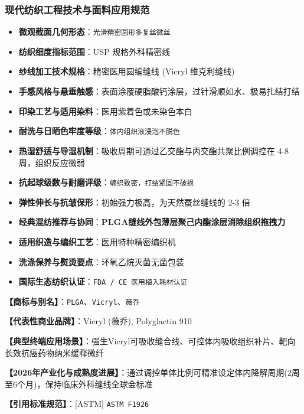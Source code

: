 \documentclass[11pt,openright,twoside,UTF8]{ctexbook}
\begin{document}
\subsubsection*{现代纺织工程技术与面料应用规范}
\begin{itemize} \setlength{\itemsep}{2pt}
    \item \textbf{微观截面几何形态}：\texttt{光滑精密圆形多复丝微丝}
    \item \textbf{纺织细度指标范围}：USP 规格外科精密线
    \item \textbf{纱线加工技术规格}：精密医用圆编缝线 (Vicryl 维克利缝线)
    \item \textbf{手感风格与悬垂触感}：表面涂覆硬脂酸钙涂层，过针滑顺如水、极易扎结打结
    \item \textbf{印染工艺与适用染料}：医用紫着色或未染色本白
    \item \textbf{耐洗与日晒色牢度等级}：\texttt{体内组织液浸泡不脱色}
    \item \textbf{热湿舒适与导湿机制}：吸收周期可通过乙交酯与丙交酯共聚比例调控在 4-8 周，组织反应微弱
    \item \textbf{抗起球级数与耐磨评级}：\texttt{编织致密，打结紧固不破损}
    \item \textbf{弹性伸长与抗皱保形}：初始强力极高，为天然蚕丝缝线的 2-3 倍
    \item \textbf{经典混纺推荐与协同}：\textbf{PLGA缝线外包薄层聚己内酯涂层消除组织拖拽力}
    \item \textbf{适用织造与编织工艺}：医用特种精密编织机
    \item \textbf{洗涤保养与熨烫要点}：环氧乙烷灭菌无菌包装
    \item \textbf{国际生态纺织认证}：\texttt{FDA / CE 医用植入耗材认证}
\end{itemize}
\vspace{0.2cm}

\noindent\textbf{【商标与别名】}：\texttt{PLGA}、\texttt{Vicryl}、\texttt{薇乔}\par
\noindent\textbf{【代表性商业品牌】}：Vicryl (薇乔), Polyglactin 910\par
\noindent\textbf{【典型终端应用场景】}：强生Vicryl可吸收缝合线、可控体内吸收组织补片、靶向长效抗癌药物纳米缓释微纤\par
\noindent\textbf{【2026年产业化与成熟度进展】}：通过调控单体比例可精准设定体内降解周期(2周至6个月)，保持临床外科缝线全球金标准\par
\noindent\textbf{【引用标准规范】}：[ASTM] \texttt{ASTM F1926}\par
\vspace{0.5cm}
\end{document}
